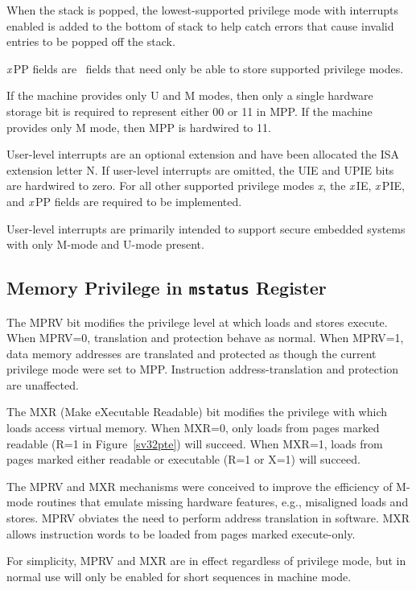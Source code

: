 \begin{commentary}
When the stack is popped, the lowest-supported privilege mode with
interrupts enabled is added to the bottom of stack to help catch
errors that cause invalid entries to be popped off the stack.
\end{commentary}

{\em x}\,PP fields are \wlrl\ fields that need only be able to store
supported privilege modes.

\begin{commentary}
If the machine provides only U and M modes, then only a single
hardware storage bit is required to represent either 00 or 11 in MPP.
If the machine provides only M mode, then MPP is hardwired to 11.
\end{commentary}

User-level interrupts are an optional extension and have been
allocated the ISA extension letter N.
If user-level interrupts are omitted, the
UIE and UPIE bits are hardwired to zero.  For all other supported
privilege modes {\em x}, the {\em x}\,IE, {\em x}\,PIE, and {\em
  x}\,PP fields are required to be implemented.

\begin{commentary}
User-level interrupts are primarily intended to support secure
embedded systems with only M-mode and U-mode present.
\end{commentary}

\subsection{Memory Privilege in {\tt mstatus} Register}

The MPRV bit modifies the privilege level at which loads and stores
execute.  When MPRV=0, translation and protection behave as normal.  When
MPRV=1, data memory addresses are translated and protected as though the
current privilege mode were set to MPP.  Instruction address-translation and
protection are unaffected.

The MXR (Make eXecutable Readable) bit modifies the privilege with
which loads access virtual memory.  When MXR=0, only loads from pages
marked readable (R=1 in Figure~\ref{sv32pte}) will succeed.  When
MXR=1, loads from pages marked either readable or executable (R=1 or
X=1) will succeed.

\begin{commentary}
The MPRV and MXR mechanisms were conceived to improve the efficiency of M-mode
routines that emulate missing hardware features, e.g., misaligned loads and
stores.  MPRV obviates the need to perform address translation in software.
MXR allows instruction words to be loaded from pages marked execute-only.

For simplicity, MPRV and MXR are in effect regardless of privilege
mode, but in normal use will only be enabled for short sequences in
machine mode.
\end{commentary}

